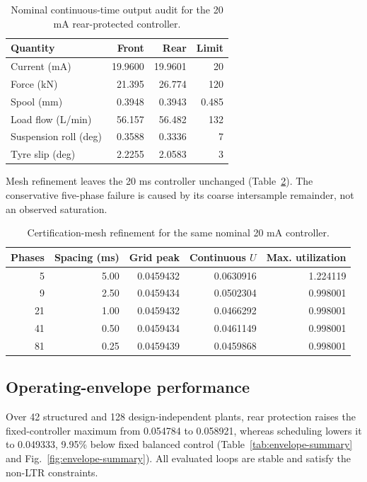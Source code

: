 \documentclass[fleqn,final,5p,times]{elsarticle}
\begin{document}
\begin{table}[!t]
\centering\small
\caption{Nominal continuous-time output audit for the 20 mA rear-protected controller.}
\label{tab:actuator-audit}
\begin{tabular}{lrrr}
\toprule
Quantity & Front & Rear & Limit\\
\midrule
Current (mA) & 19.9600 & 19.9601 & 20\\
Force (kN) & 21.395 & 26.774 & 120\\
Spool (mm) & 0.3948 & 0.3943 & 0.485\\
Load flow (L/min) & 56.157 & 56.482 & 132\\
Suspension roll (deg) & 0.3588 & 0.3336 & 7\\
Tyre slip (deg) & 2.2255 & 2.0583 & 3\\
\bottomrule
\end{tabular}
\end{table}

Mesh refinement leaves the 20 ms controller unchanged (Table~\ref{tab:mesh-refinement}). The conservative five-phase failure is caused by its coarse intersample remainder, not an observed saturation.

\begin{table}[!t]
\centering\scriptsize
\caption{Certification-mesh refinement for the same nominal 20 mA controller.}
\label{tab:mesh-refinement}
\begin{tabular}{rrrrr}
\toprule
Phases & Spacing (ms) & Grid peak & Continuous $U$ & Max. utilization\\
\midrule
5  & 5.00 & 0.0459432 & 0.0630916 & 1.224119\\
9  & 2.50 & 0.0459434 & 0.0502304 & 0.998001\\
21 & 1.00 & 0.0459432 & 0.0466292 & 0.998001\\
41 & 0.50 & 0.0459434 & 0.0461149 & 0.998001\\
81 & 0.25 & 0.0459439 & 0.0459868 & 0.998001\\
\bottomrule
\end{tabular}
\end{table}

\subsection{Operating-envelope performance}

Over 42 structured and 128 design-independent plants, rear protection raises the fixed-controller maximum from 0.054784 to 0.058921, whereas scheduling lowers it to 0.049333, 9.95\% below fixed balanced control (Table~\ref{tab:envelope-summary} and Fig.~\ref{fig:envelope-summary}). All evaluated loops are stable and satisfy the non-LTR constraints.
\end{document}
